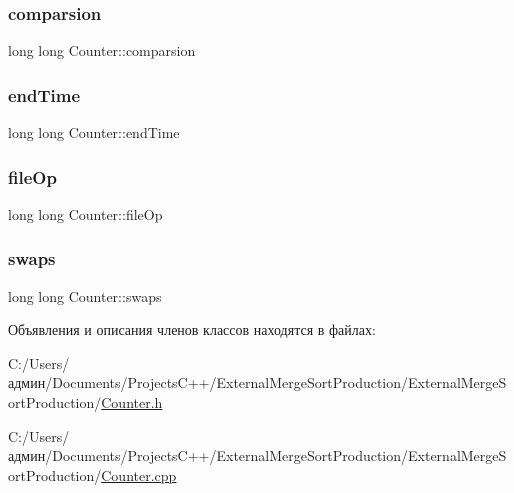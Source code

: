 \hypertarget{class_counter_a20f5a772c02412c338457dcc85c4a543}{}\label{class_counter_a20f5a772c02412c338457dcc85c4a543} 
\subsubsection{\texorpdfstring{comparsion}{comparsion}}
{\footnotesize\ttfamily long long Counter\+::comparsion\hspace{0.3cm}{\ttfamily [private]}}

\hypertarget{class_counter_a961ca391c9a8e3ac0efb8d6d61d734d4}{}\label{class_counter_a961ca391c9a8e3ac0efb8d6d61d734d4} 
\subsubsection{\texorpdfstring{end\+Time}{endTime}}
{\footnotesize\ttfamily long long Counter\+::end\+Time\hspace{0.3cm}{\ttfamily [private]}}

\hypertarget{class_counter_abc197117fc99ab93bebc483059ae0fbc}{}\label{class_counter_abc197117fc99ab93bebc483059ae0fbc} 
\subsubsection{\texorpdfstring{file\+Op}{fileOp}}
{\footnotesize\ttfamily long long Counter\+::file\+Op\hspace{0.3cm}{\ttfamily [private]}}

\hypertarget{class_counter_a2a5ee961a25c6eb87d1ad02bcef4ade1}{}\label{class_counter_a2a5ee961a25c6eb87d1ad02bcef4ade1} 
\subsubsection{\texorpdfstring{swaps}{swaps}}
{\footnotesize\ttfamily long long Counter\+::swaps\hspace{0.3cm}{\ttfamily [private]}}



Объявления и описания членов классов находятся в файлах\+:\begin{DoxyCompactItemize}
\item 
C\+:/\+Users/админ/\+Documents/\+Projects\+C++/\+External\+Merge\+Sort\+Production/\+External\+Merge\+Sort\+Production/\hyperlink{_counter_8h}{Counter.\+h}\item 
C\+:/\+Users/админ/\+Documents/\+Projects\+C++/\+External\+Merge\+Sort\+Production/\+External\+Merge\+Sort\+Production/\hyperlink{_counter_8cpp}{Counter.\+cpp}\end{DoxyCompactItemize}
